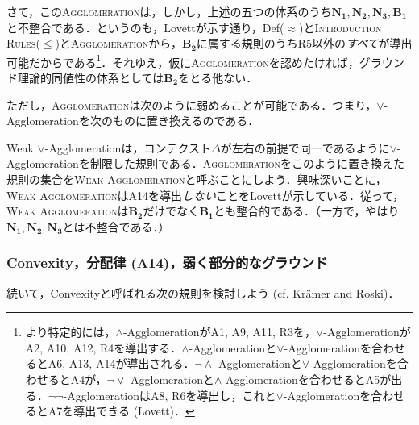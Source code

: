 \documentclass[twoside,14Q,uplatex,dvipdfmx]{jsarticle}
\theoremstyle{definition}
\begin{document}
さて，この\textsc{Agglomeration}は，しかし，上述の五つの体系のうち$\mathbf{N_{1}, N_{2}, N_{3}, B_{1}}$と不整合である．というのも，Lovett\cite[Appendix A.3]{Lovett2020}が示す通り，Def($\approx$)と\textsc{Introduction Rules($\leq$)}と\textsc{Agglomeration}から，$\mathbf{B_{2}}$に属する規則のうちR5以外の\emph{すべて}が導出可能だからである\footnote{
より特定的には，$\land$-AgglomerationがA1, A9, A11, R3を，$\lor$-AgglomerationがA2, A10, A12, R4を導出する．$\land$-Agglomerationと$\lor$-Agglomerationを合わせるとA6, A13, A14が導出される．$\lnot\land$-Agglomerationと$\lor$-Agglomerationを合わせるとA4が，$\lnot\lor$-Agglomerationと$\land$-Agglomerationを合わせるとA5が出る．$\lnot\lnot$-AgglomerationはA8, R6を導出し，これと$\lor$-Agglomerationを合わせるとA7を導出できる (Lovett\cite[Appendix A.3]{Lovett2020})．
}．それゆえ，仮に\textsc{Agglomeration}を認めたければ，グラウンド理論的同値性の体系としては$\mathbf{B_{2}}$をとる他ない．

ただし，\textsc{Agglomeration}は次のように弱めることが可能である．つまり，$\lor$-Agglomerationを次のものに置き換えるのである．

\begin{prooftree}
\end{prooftree}

\noindent Weak $\lor$-Agglomerationは，コンテクスト$\Delta$が左右の前提で同一であるように$\lor$-Agglomerationを制限した規則である．\textsc{Agglomeration}をこのように置き換えた規則の集合を\textsc{Weak Agglomeration}と呼ぶことにしよう．興味深いことに，\textsc{Weak Agglomeration}はA14を導出\emph{しない}ことをLovett\cite[pp.21-3]{Lovett2020}が示している．従って，\textsc{Weak Agglomeration}は$\mathbf{B_{2}}$だけでなく$\mathbf{B_{1}}$とも整合的である．（一方で，やはり$\mathbf{N_{1}, N_{2}, N_{3}}$とは不整合である．）
%
%
%
\subsubsection{Convexity，分配律 (A14)，弱く部分的なグラウンド}\label{convexity}
続いて，Convexityと呼ばれる次の規則を検討しよう (cf. Kr\"{a}mer and Roski\cite{KramerandRoski2015})．

\begin{prooftree}
\end{prooftree}
\end{document}
